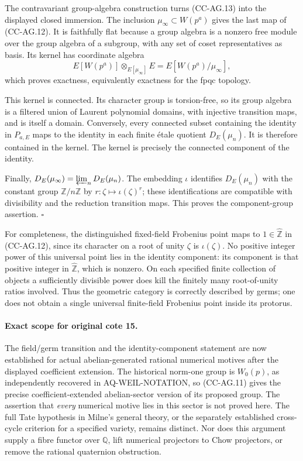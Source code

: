 \documentclass[11pt,a4paper]{article}
\theoremstyle{definition}\newtheorem{definition}[theorem]{Definition}
\theoremstyle{remark}\newtheorem{remark}[theorem]{Remark}
\begin{document}
The contravariant group-algebra construction turns (CC-AG.13)
into the displayed closed immersion. The inclusion
\(\mu_\infty\subset W(p^a)\) gives the last map of (CC-AG.12).
It is faithfully flat because a group algebra is a nonzero free
module over the group algebra of a subgroup, with any set of
coset representatives as basis. Its kernel has coordinate algebra
\[
 E[W(p^a)]\otimes_{E[\mu_\infty]}E
 =E[W(p^a)/\mu_\infty],
\]
which proves exactness, equivalently exactness for the fpqc
topology.

This kernel is connected. Its character group is torsion-free,
so its group algebra is a filtered union of Laurent polynomial
domains, with injective transition maps, and is itself a domain.
Conversely, every connected subset containing the identity in
\(P_{a,E}\) maps to the identity in each finite \'etale quotient
\(D_E(\mu_n)\). It is therefore contained in the kernel.
The kernel is precisely the connected component of the identity.

Finally,
\(D_E(\mu_\infty)=\varprojlim_n D_E(\mu_n)\).
The embedding \(\iota\) identifies
\(D_E(\mu_n)\) with the constant group \(\mathbb Z/n\mathbb Z\)
by \(r:\zeta\mapsto\iota(\zeta)^r\); these identifications are
compatible with divisibility and the reduction transition maps.
This proves the component-group assertion. \(\square\)

For completeness, the distinguished fixed-field Frobenius point
maps to \(1\in\widehat{\mathbb Z}\) in (CC-AG.12), since its
character on a root of unity \(\zeta\) is \(\iota(\zeta)\).
No positive integer power of this universal point lies in the
identity component: its component is that positive integer in
\(\widehat{\mathbb Z}\), which is nonzero. On each specified
finite collection of objects a sufficiently divisible power
does kill the finitely many root-of-unity ratios involved.
Thus the geometric category is correctly described by germs;
one does not obtain a single universal finite-field Frobenius
point inside its protorus.

\paragraph{Exact scope for original cote 15.}
The field/germ transition and the identity-component statement
are now established for actual abelian-generated rational numerical
motives after the displayed coefficient extension. The historical
norm-one group is \(W_0(p)\), as independently recovered in
AQ-WEIL-NOTATION, so (CC-AG.11) gives the precise coefficient-extended
abelian-sector version of its proposed group.
The assertion that \emph{every} numerical motive lies in this sector
is not proved here. The full Tate hypothesis in Milne's general
theory, or the separately established cross-cycle criterion for a
specified variety, remains distinct. Nor does this argument supply
a fibre functor over \(\mathbb Q\), lift numerical projectors to
Chow projectors, or remove the rational quaternion obstruction.
\end{document}
